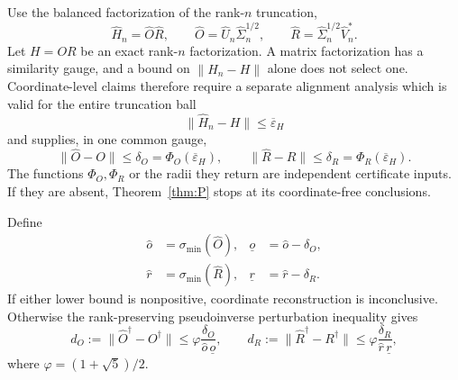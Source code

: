 \documentclass[aps,prl,onecolumn,superscriptaddress,nofootinbib]{revtex4-2}
\newcommand{\eps}{\varepsilon}
\begin{document}
Use the balanced factorization of the rank-$n$ truncation,
\begin{equation}
 \widehat H_n=\widehat O\widehat R,
 \qquad
 \widehat O=\widehat U_n\widehat\Sigma_n^{1/2},
 \qquad
 \widehat R=\widehat\Sigma_n^{1/2}\widehat V_n^*.
 \label{eq:balanced-truncated-factorization}
\end{equation}
Let $H=OR$ be an exact rank-$n$ factorization.  A matrix factorization has a similarity gauge, and a bound on $\|\widehat H_n-H\|$ alone does not select one.  Coordinate-level claims therefore require a separate alignment analysis which is valid for the entire truncation ball
\begin{equation}
 \|\widehat H_n-H\|\le\overline\eps_H
\end{equation}
and supplies, in one common gauge,
\begin{equation}
 \|\widehat O-O\|\le\delta_O=\Phi_O(\overline\eps_H),
 \qquad
 \|\widehat R-R\|\le\delta_R=\Phi_R(\overline\eps_H).
 \label{eq:factor-errors}
\end{equation}
The functions $\Phi_O,\Phi_R$ or the radii they return are independent certificate inputs.  If they are absent, Theorem~\ref{thm:P} stops at its coordinate-free conclusions.

Define
\begin{align}
 \widehat o&=\sigma_{\min}(\widehat O),&
 \underline o&=\widehat o-\delta_O,\nonumber\\
 \widehat r&=\sigma_{\min}(\widehat R),&
 \underline r&=\widehat r-\delta_R.
 \label{eq:factor-gaps}
\end{align}
If either lower bound is nonpositive, coordinate reconstruction is inconclusive.  Otherwise the rank-preserving pseudoinverse perturbation inequality gives
\begin{equation}
 d_O:=\|\widehat O^\dagger-O^\dagger\|
 \le\varphi\frac{\delta_O}{\widehat o\,\underline o},
 \qquad
 d_R:=\|\widehat R^\dagger-R^\dagger\|
 \le\varphi\frac{\delta_R}{\widehat r\,\underline r},
 \label{eq:pinv-bounds}
\end{equation}
where $\varphi=(1+\sqrt5)/2$.
\end{document}
